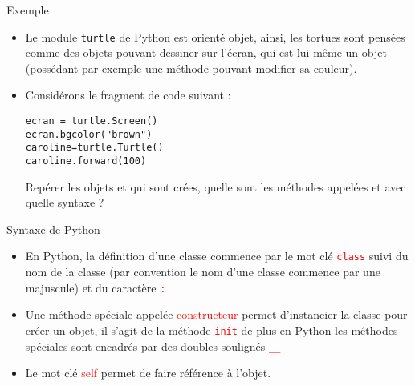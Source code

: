 \documentclass[10pt]{beamer}
\begin{document}
\begin{frame}[fragile]
\mframe{\POO}
\begin{exampleblock}{Exemple}
\begin{itemize}
\item<1-> Le module {\tt turtle} de Python est orienté objet, ainsi, les tortues sont pensées comme des objets  pouvant dessiner sur  l'écran, qui est lui-même un objet  (possédant par exemple une méthode pouvant modifier sa couleur).
\item<2-> Considérons le fragment de code suivant :
\begin{lstlisting}
ecran = turtle.Screen()
ecran.bgcolor("brown")
caroline=turtle.Turtle()
caroline.forward(100)
\end{lstlisting}
Repérer les objets et qui sont crées, quelle sont les méthodes appelées et avec quelle syntaxe ?
\end{itemize}
\end{exampleblock}
\end{frame}

\begin{frame}
\mframe{\POO}
\begin{block}{Syntaxe de Python}
\begin{itemize}
\item<2-> En Python, la définition d'une classe commence par le mot clé \textcolor{red}{\tt class} suivi du nom de la classe (par convention le nom d'une classe commence par une majuscule) et du caractère \textcolor{red}{\tt :}
\item<3-> Une méthode spéciale appelée \textcolor{red}{constructeur} permet d'instancier la classe pour créer un objet, il s'agit de la méthode \textcolor{red}{\tt init} de plus en Python les méthodes spéciales sont encadrés par des doubles soulignés \textcolor{red}{\tt \_\_}
\item<4-> Le mot clé \textcolor{red}{self} permet de faire référence à l'objet.
\end{itemize}
\end{block}
\end{frame}
\end{document}
